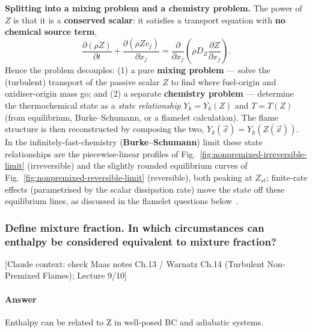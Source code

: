 {\textbf{Splitting into a mixing problem and a chemistry problem.} The power of $Z$ is that it is a \textbf{conserved scalar}: it satisfies a transport equation with \textbf{no chemical source term},
\begin{equation*}
\frac{\partial(\rho Z)}{\partial t} + \frac{\partial(\rho Z v_j)}{\partial x_j} = \frac{\partial}{\partial x_j}\!\left(\rho D_Z\frac{\partial Z}{\partial x_j}\right).
\end{equation*}
Hence the problem decouples: (1) a pure \textbf{mixing problem} --- solve the (turbulent) transport of the passive scalar $Z$ to find where fuel-origin and oxidiser-origin mass go; and (2) a separate \textbf{chemistry problem} --- determine the thermochemical state as a \emph{state relationship} $Y_k = Y_k(Z)$ and $T=T(Z)$ (from equilibrium, Burke--Schumann, or a flamelet calculation). The flame structure is then reconstructed by composing the two, $Y_k(\vec x) = Y_k(Z(\vec x))$. In the infinitely-fast-chemistry (\textbf{Burke--Schumann}) limit these state relationships are the piecewise-linear profiles of Fig.~\ref{fig:nonpremixed-irreversible-limit} (irreversible) and the slightly rounded equilibrium curves of Fig.~\ref{fig:nonpremixed-reversible-limit} (reversible), both peaking at $Z_{st}$; finite-rate effects (parametrised by the scalar dissipation rate) move the state off these equilibrium lines, as discussed in the flamelet questions below~\cite{lecture9,poinsot2012theoretical}.
}

\subsubsection{Define mixture fraction. In which circumstances can enthalpy be considered equivalent to mixture fraction?}

{\color{gray}\footnotesize [Claude context: check Maas notes Ch.13 / Warnatz Ch.14 (Turbulent Non-Premixed Flames); Lecture 9/10]}

\paragraph{Answer}

Enthalpy can be related to Z in well-posed BC and adiabatic systems.

